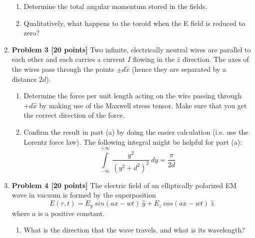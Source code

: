 \documentclass[fleqn]{article}
\begin{document}
\begin{enumerate}
\begin{enumerate}

        \item Determine the total angular momentum stored in the fields.


        \item Qualitatively, what happens to the toroid when the E field is reduced to zero?


      \end{enumerate}

    \item \textbf{Problem 3 [20 points]} 
    Two infinite, electrically neutral wires are parallel to each other and each carries a current $I$ flowing
    in the $\hat{z}$ direction. The axes of the wires pass through the points $\pm d\hat{x}$ (hence they are separated by
    a distance $2d$).
    \begin{enumerate}
      \item Determine the force per unit length acting on the wire passing through $+d\hat{x}$ by making use of
      the Maxwell stress tensor. Make sure that you get the correct direction of the force.



      \item Confirm the result in part (a) by doing the easier calculation (i.e. use the Lorentz force law).
      The following integral might be helpful for part (a):
      $$
        \int\limits_{-\infty}^{+\infty} ~ \dfrac{y^2}{\left(y^2+d^2\right)^2} ~ dy=\dfrac{\pi}{2d} 
      $$


    \end{enumerate}

    \item \textbf{Problem 4 [20 points]} The electric field of an elliptically polarized EM wave in vacuum is formed by the superposition
      $$
        E(r,t)=E_y ~ sin(ax-wt) ~ \hat{y}+E_z ~ cos(ax-wt) ~ \hat{z}
      $$
      where $a$ is a positive constant.
      \begin{enumerate}
        \item What is the direction that the wave travels, and what is its wavelength?


\end{enumerate}
\end{enumerate}
\end{document}
